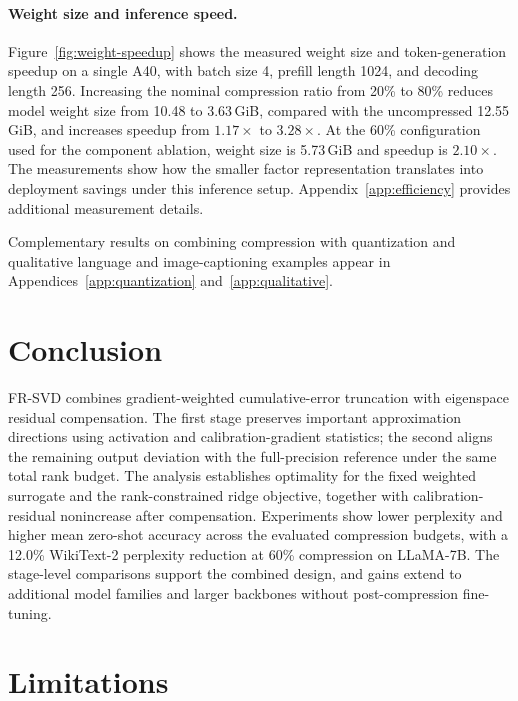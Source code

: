 \documentclass[11pt]{article}
\begin{document}
\paragraph{Weight size and inference speed.}
Figure~\ref{fig:weight-speedup} shows the measured weight size and token-generation speedup on a single A40, with batch size 4, prefill length 1024, and decoding length 256. Increasing the nominal compression ratio from 20\% to 80\% reduces model weight size from 10.48 to 3.63\,GiB, compared with the uncompressed 12.55\,GiB, and increases speedup from $1.17\times$ to $3.28\times$. At the 60\% configuration used for the component ablation, weight size is 5.73\,GiB and speedup is $2.10\times$. The measurements show how the smaller factor representation translates into deployment savings under this inference setup. Appendix~\ref{app:efficiency} provides additional measurement details.



Complementary results on combining compression with quantization and qualitative language and image-captioning examples appear in Appendices~\ref{app:quantization} and~\ref{app:qualitative}.

\section{Conclusion}\label{sec:conclusion}

FR-SVD combines gradient-weighted cumulative-error truncation with eigenspace residual compensation. The first stage preserves important approximation directions using activation and calibration-gradient statistics; the second aligns the remaining output deviation with the full-precision reference under the same total rank budget. The analysis establishes optimality for the fixed weighted surrogate and the rank-constrained ridge objective, together with calibration-residual nonincrease after compensation. Experiments show lower perplexity and higher mean zero-shot accuracy across the evaluated compression budgets, with a 12.0\% WikiText-2 perplexity reduction at 60\% compression on LLaMA-7B. The stage-level comparisons support the combined design, and gains extend to additional model families and larger backbones without post-compression fine-tuning.
\FloatBarrier
\label{main:end}

\section*{Limitations}
\end{document}

